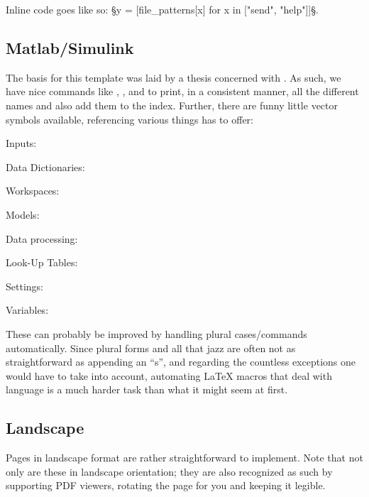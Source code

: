 Inline code goes like so: §y = [file_patterns[x] for x in ["send", "help"]]§.

\subsection{Matlab/Simulink}%
The basis for this template was laid by a thesis concerned with \mtlbsmlnk{}.
As such, we have nice commands like \mtlb{}, \smlnk{}, \mtlbsmlnk{} and \mtlbsymb{} to print, in a consistent manner, all the different names and also add them to the index.
Further, there are funny little vector symbols available, referencing various things \mtlbsmlnk{} has to offer:
\begin{description}
	\item Inputs: \SimulinkStep{} \quad \SimulinkSteps{}
	\item Data Dictionaries: \SimulinkDD{} \quad \SimulinkDDs{}
	\item Workspaces: \SimulinkBaseWS{} \quad \SimulinkModelWS{} \quad \SimulinkModelWSs{}
	\item Models: \SimulinkModel{} \quad \SimulinkModels{} \quad \SimulinkRefM{} \quad \SimulinkRefMs{} \quad \SimulinkLibM{} \quad \SimulinkLibMs{} \quad \SimulinkLibrary{} \quad \SimulinkLibraries{}
	\item Data processing: \SimulinkLogData{}
	\item Look-Up Tables: \SimulinkLUT{} \quad \SimulinkLUTs{}
	\item Settings: \SimulinkConfiguration{}
	\item Variables:  \quad \MatlabStruct{} \quad \MatlabStructs{} \quad \MatlabTable{} \quad \MatlabTables{} \quad {} \quad {} \quad \SimulinkBus{} \quad \SimulinkBuses{}
\end{description}
These can probably be improved by handling plural cases/commands automatically.
Since plural forms and all that jazz are often not as straightforward as appending an \enquote{s}, and regarding the countless exceptions one would have to take into account, automating \LaTeX{} macros that deal with language is a much harder task than what it might seem at first.
\begin{landscape}
\section{Landscape}

Pages in landscape format are rather straightforward to implement.
Note that not only are these in landscape orientation; they are also recognized as such by supporting PDF viewers, rotating the page for you and keeping it legible.
\end{landscape}
